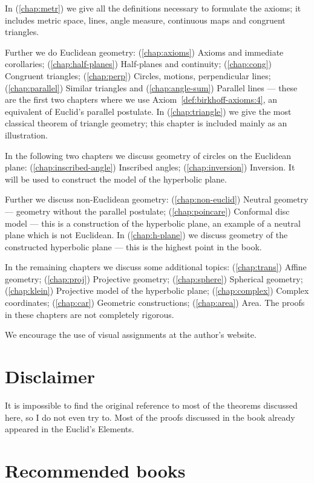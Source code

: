 In (\ref{chap:metr}) we give all the definitions necessary to formulate the axioms;
it includes metric space, 
lines, 
angle measure, 
continuous maps and congruent triangles.


Further we do Euclidean geometry:
(\ref{chap:axioms}) Axioms and immediate corollaries;
(\ref{chap:half-planes}) Half-planes and continuity;
(\ref{chap:cong}) Congruent triangles;
(\ref{chap:perp}) Circles, motions, perpendicular lines;
(\ref{chap:parallel}) Similar triangles and (\ref{chap:angle-sum}) Parallel lines  
--- these are the first two chapters where we use Axiom~\ref{def:birkhoff-axioms:4}, an equivalent of Euclid's parallel postulate.
In (\ref{chap:triangle}) we give the most classical theorem of triangle geometry;
this chapter is included mainly as an illustration.


In the following two chapters we discuss geometry of circles on the Euclidean plane:
(\ref{chap:inscribed-angle}) Inscribed angles; (\ref{chap:inversion}) Inversion.
It  will be used to construct the model of the hyperbolic plane.

Further 
we discuss non-Euclidean geometry:
(\ref{chap:non-euclid})
Neutral geometry --- geometry without the parallel postulate;
(\ref{chap:poincare})
Conformal disc model ---
this is a construction of the hyperbolic plane,
an example of a neutral plane which is not Euclidean.
In (\ref{chap:h-plane}) we discuss geometry of the constructed hyperbolic plane --- this is the highest point in the book.

In the remaining chapters we discuss some additional topics:
(\ref{chap:trans}) Affine geometry;
(\ref{chap:proj}) Projective geometry;
(\ref{chap:sphere}) Spherical geometry;
(\ref{chap:klein}) Projective model of the hyperbolic plane;
(\ref{chap:complex}) Complex coordinates;
(\ref{chap:car}) Geometric constructions;
(\ref{chap:area}) Area.
The proofs in these chapters are not completely rigorous.

We encourage the use of visual assignments at the author's website.

\section*{Disclaimer}

It is  impossible to find the original reference to most of the theorems discussed here, so I do not even try to.
Most of the proofs discussed in the book 
already appeared in the Euclid's Elements.

\section*{Recommended books}

